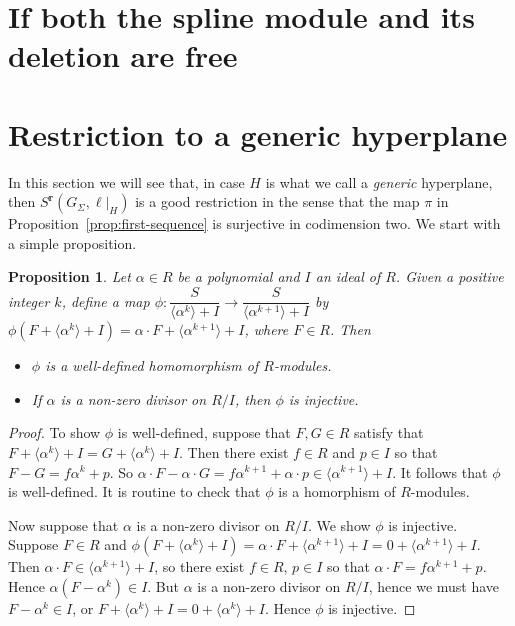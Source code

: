 \documentclass[11pt, reqno]{amsart}
\newcommand{\br}{\mathbf{r}}
\newtheorem{proposition}[theorem]{Proposition}
\theoremstyle{definition}
\theoremstyle{remark}
\numberwithin{equation}{section}
\begin{document}
\section{If both the spline module and its deletion are free}

\section{Restriction to a generic hyperplane}

In this section we will see that, in case $H$ is what we call a \textit{generic} hyperplane, then $S^{\br}(G_{\Sigma},\ell|_H)$ is a good restriction in the sense that the map $\pi$ in Proposition~\ref{prop:first-sequence} is surjective in codimension two.  We start with a simple proposition.

\begin{proposition}
Let $\alpha\in R$ be a polynomial and $I$ an ideal of $R$.  Given a positive integer $k$, define a map $\phi: \dfrac{S}{\langle \alpha^k\rangle+I}\to \dfrac{S}{\langle \alpha^{k+1}\rangle +I}$ by $\phi(F+\langle \alpha^k\rangle+I)=\alpha\cdot F+\langle \alpha^{k+1}\rangle+I$, where $F\in R$.  Then
\begin{itemize}
\item $\phi$ is a well-defined homomorphism of $R$-modules.
\item If $\alpha$ is a non-zero divisor on $R/I$, then $\phi$ is injective.
\end{itemize}
\end{proposition}
\begin{proof}
To show $\phi$ is well-defined, suppose that $F,G\in R$ satisfy that $F+\langle\alpha^k\rangle+I=G+\langle\alpha^k\rangle+I$.  Then there exist $f\in R$ and $p\in I$ so that $F-G=f\alpha^k+p$.  So $\alpha\cdot F-\alpha\cdot G=f\alpha^{k+1}+\alpha\cdot p\in \langle\alpha^{k+1}\rangle+I$.  It follows that $\phi$ is well-defined.  It is routine to check that $\phi$ is a homorphism of $R$-modules.

Now suppose that $\alpha$ is a non-zero divisor on $R/I$.  We show $\phi$ is injective.  Suppose $F\in R$ and $\phi(F+\langle \alpha^k\rangle+I)=\alpha\cdot F+\langle\alpha^{k+1}\rangle+I=0+\langle\alpha^{k+1}\rangle+I$.  Then $\alpha\cdot F\in \langle\alpha^{k+1}\rangle+I$, so there exist $f\in R$, $p\in I$ so that $\alpha\cdot F=f\alpha^{k+1}+p$.  Hence $\alpha(F-\alpha^k)\in I$.  But $\alpha$ is a non-zero divisor on $R/I$, hence we must have $F-\alpha^k\in I$, or $F+\langle \alpha^{k}\rangle + I=0+\langle \alpha^{k}\rangle + I$.  Hence $\phi$ is injective.
\end{proof}
\end{document}
